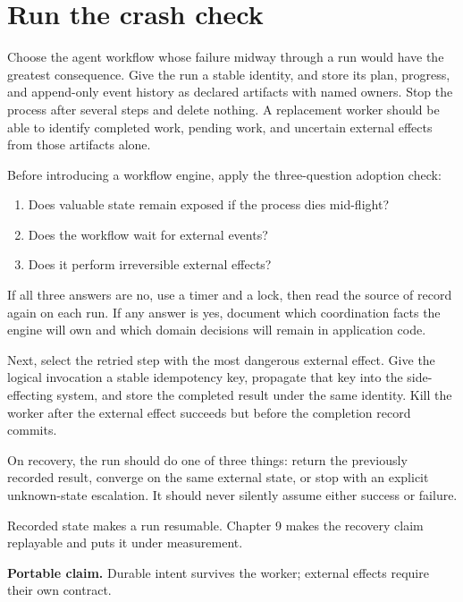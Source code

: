 \hypertarget{run-the-crash-check}{%
\section{Run the crash check}\label{run-the-crash-check}}

Choose the agent workflow whose failure midway through a run would have the greatest consequence. Give the run a stable identity, and store its plan, progress, and append-only event history as declared artifacts with named owners. Stop the process after several steps and delete nothing. A replacement worker should be able to identify completed work, pending work, and uncertain external effects from those artifacts alone.


Before introducing a workflow engine, apply the three-question adoption check:

\begin{enumerate}
\def\labelenumi{\arabic{enumi}.}
\tightlist
\item
  Does valuable state remain exposed if the process dies mid-flight?
\item
  Does the workflow wait for external events?
\item
  Does it perform irreversible external effects?
\end{enumerate}

If all three answers are no, use a timer and a lock, then read the source of record again on each run. If any answer is yes, document which coordination facts the engine will own and which domain decisions will remain in application code.

Next, select the retried step with the most dangerous external effect. Give the logical invocation a stable idempotency key, propagate that key into the side-effecting system, and store the completed result under the same identity. Kill the worker after the external effect succeeds but before the completion record commits.

On recovery, the run should do one of three things: return the previously recorded result, converge on the same external state, or stop with an explicit unknown-state escalation. It should never silently assume either success or failure.

Recorded state makes a run resumable. Chapter 9 makes the recovery claim replayable and puts it under measurement.

\textbf{Portable claim.} Durable intent survives the worker; external effects require their own contract.

